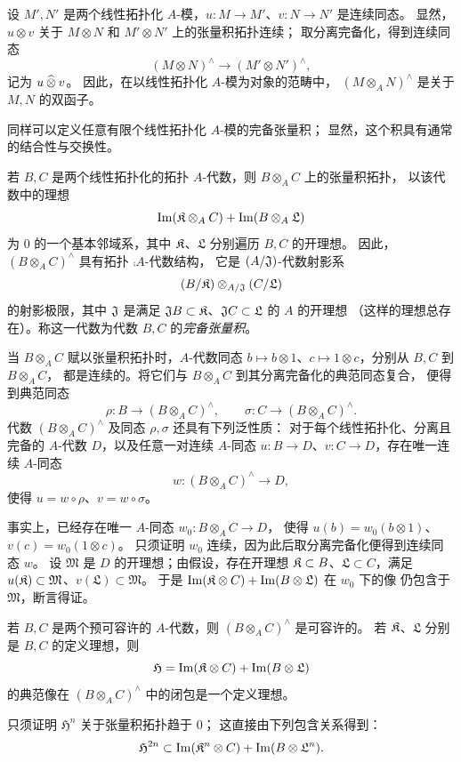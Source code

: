 设 $M',N'$ 是两个线性拓扑化 $A$-模，$u:M\to M'$、$v:N\to N'$ 是连续同态。
显然，$u\otimes v$ 关于 $M\otimes N$ 和 $M'\otimes N'$ 上的张量积拓扑连续；
取分离完备化，得到连续同态
\[
 (M\otimes N)^\wedge\longrightarrow(M'\otimes N')^\wedge,
\]
记为 $u\mathbin{\widehat{\otimes}} v$。
因此，在以线性拓扑化 $A$-模为对象的范畴中，
$(M\otimes_A N)^\wedge$ 是关于 $M,N$ 的双函子。

同样可以定义任意有限个线性拓扑化 $A$-模的完备张量积；
显然，这个积具有通常的结合性与交换性。

若 $B,C$ 是两个线性拓扑化的拓扑 $A$-代数，则 $B\otimes_A C$ 上的张量积拓扑，
以该代数中的理想
\[
 \operatorname{Im}(\mathfrak K\otimes_A C)+\operatorname{Im}(B\otimes_A\mathfrak L)
\]
为 $0$ 的一个基本邻域系，其中 $\mathfrak K$、$\mathfrak L$ 分别遍历 $B,C$ 的开理想。
因此，$(B\otimes_A C)^\wedge$ 具有拓扑 $\comp A$-代数结构，
它是 $(A/\mathfrak J)$-代数射影系
\[
 (B/\mathfrak K)\otimes_{A/\mathfrak J}(C/\mathfrak L)
\]
的射影极限，其中 $\mathfrak J$ 是满足
$\mathfrak J B\subset\mathfrak K$、$\mathfrak J C\subset\mathfrak L$ 的 $A$ 的开理想
（这样的理想总存在）。称这一代数为代数 $B,C$ 的\emph{完备张量积}。

当 $B\otimes_A C$ 赋以张量积拓扑时，$A$-代数同态
$b\mapsto b\otimes1$、$c\mapsto1\otimes c$，分别从 $B,C$ 到 $B\otimes_A C$，
都是连续的。将它们与 $B\otimes_A C$ 到其分离完备化的典范同态复合，
便得到典范同态
\[
 \rho:B\longrightarrow(B\otimes_A C)^\wedge,
 \qquad
 \sigma:C\longrightarrow(B\otimes_A C)^\wedge.
\]
代数 $(B\otimes_A C)^\wedge$ 及同态 $\rho,\sigma$ 还具有下列泛性质：
对于每个线性拓扑化、分离且完备的 $A$-代数 $D$，以及任意一对连续
$A$-同态 $u:B\to D$、$v:C\to D$，存在唯一连续 $A$-同态
\[
 w:(B\otimes_A C)^\wedge\longrightarrow D,
\]
使得 $u=w\circ\rho$、$v=w\circ\sigma$。

事实上，已经存在唯一 $A$-同态 $w_0:B\otimes_A C\to D$，
使得 $u(b)=w_0(b\otimes1)$、$v(c)=w_0(1\otimes c)$。
只须证明 $w_0$ 连续，因为此后取分离完备化便得到连续同态 $w$。
设 $\mathfrak M$ 是 $D$ 的开理想；由假设，存在开理想
$\mathfrak K\subset B$、$\mathfrak L\subset C$，满足
$u(\mathfrak K)\subset\mathfrak M$、$v(\mathfrak L)\subset\mathfrak M$。
于是 $\operatorname{Im}(\mathfrak K\otimes C)+\operatorname{Im}(B\otimes\mathfrak L)$ 在 $w_0$ 下的像
仍包含于 $\mathfrak M$，断言得证。

若 $B,C$ 是两个预可容许的 $A$-代数，则 $(B\otimes_A C)^\wedge$ 是可容许的。
若 $\mathfrak K$、$\mathfrak L$ 分别是 $B,C$ 的定义理想，则
\[
 \mathfrak H=\operatorname{Im}(\mathfrak K\otimes C)+\operatorname{Im}(B\otimes\mathfrak L)
\]
的典范像在 $(B\otimes_A C)^\wedge$ 中的闭包是一个定义理想。

只须证明 $\mathfrak H^n$ 关于张量积拓扑趋于 $0$；
这直接由下列包含关系得到：
\[
 \mathfrak H^{2n}\subset
 \operatorname{Im}(\mathfrak K^n\otimes C)+\operatorname{Im}(B\otimes\mathfrak L^n).
\]

